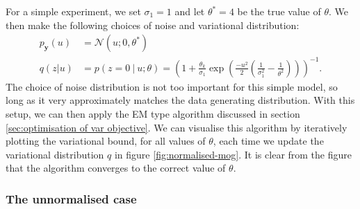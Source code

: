\documentclass[11pt, oneside]{article}
\newcommand{\pnoise}{p_{ \mathbf y}}
\theoremstyle{definition}
\begin{document}
For a simple experiment, we set $\sigma_1 = 1$ and let $\theta^* = 4$ be the true value of $\theta$. We then make the following choices of noise and variational distribution:
\begin{align}
    \label{eq:normalised mog posterior}
    \pnoise(u) &= \mathcal{N}(u; 0, \theta^*) \\
    q(z|u) &= p(z=0 \ | \ u; \theta) = \left(  1 + \frac{\theta_k}{\sigma_1} \exp \left(\frac{- u^2}{2} \left( \frac{1}{\sigma_1^2} - \frac{1}{\theta^2} \right) \right) \right)^{-1}.
\end{align}
The choice of noise distribution is not too important for this simple model, so long as it very approximately matches the data generating distribution. With this setup, we can then apply the EM type algorithm discussed in section \ref{sec:optimisation of var objective}. We can visualise this algorithm by iteratively plotting the variational bound, for all values of $\theta$, each time we update the variational distribution $q$ in figure \ref{fig:normalised-mog}. It is clear from the figure that the algorithm converges to the correct value of $\theta$.



\subsubsection{The unnormalised case}
\end{document}
